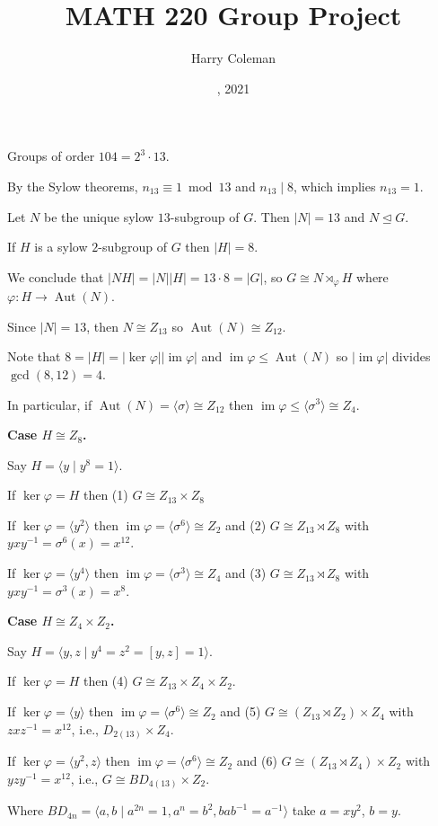 \documentclass[12pt]{article}
\renewcommand{\maketitle}{\thispagestyle{title}}
\theoremstyle{definition}
\renewcommand{\phi}{\varphi}
\newcommand{\<}{\langle}
\renewcommand{\>}{\rangle}
\newcommand{\isom}{\cong}
\newcommand{\teq}{\trianglelefteq}
\DeclareMathOperator{\im}{im}
\DeclareMathOperator{\Aut}{Aut}
\begin{document}
\title{MATH 220 Group Project}
\author{Harry Coleman}
\date{, 2021}
\maketitle

Groups of order $104 = 2^3 \cdot 13$.

By the Sylow theorems, $n_{13} \equiv 1 \bmod 13$ and $n_{13} \mid 8$, which implies $n_{13} = 1$.

Let $N$ be the unique sylow $13$-subgroup of $G$. Then $|N| = 13$ and $N \teq G$.

If $H$ is a sylow $2$-subgroup of $G$ then $|H| = 8$.

We conclude that $|NH| = |N||H| = 13 \cdot 8 = |G|$, so $G \isom N \rtimes_\phi H$ where $\phi : H \to \Aut(N)$.

Since $|N| = 13$, then $N \isom Z_{13}$ so $\Aut(N) \isom Z_{12}$.

Note that $8 = |H| = |\ker\phi||\im\phi|$ and $\im\phi \leq \Aut(N)$ so $|\im\phi|$ divides $\gcd(8, 12) = 4$.

In particular, if $\Aut(N) = \<\sigma\> \isom Z_{12}$ then $\im\phi \leq \<\sigma^3\> \isom Z_4$.

\textbf{Case $H \isom Z_8$.}

Say $H = \<y \mid y^8 = 1\>$.

If $\ker\phi = H$ then (1) $G \isom Z_{13} \times Z_8$

If $\ker\phi = \<y^2\>$ then $\im\phi = \<\sigma^6\> \isom Z_2$ and (2) $G \isom Z_{13} \rtimes Z_8$ with $yxy^{-1} = \sigma^6(x) = x^{12}$.

If $\ker\phi = \<y^4\>$ then $\im\phi = \<\sigma^3\> \isom Z_4$ and (3) $G \isom Z_{13} \rtimes Z_8$ with $yxy^{-1} = \sigma^3(x) = x^8$.

\textbf{Case $H \isom Z_4 \times Z_2$.}

Say $H = \<y, z \mid y^4 = z^2 = [y, z] = 1\>$.

If $\ker\phi = H$ then (4) $G \isom Z_{13} \times Z_4 \times Z_2$.

If $\ker\phi = \<y\>$ then $\im\phi = \<\sigma^6\> \isom Z_2$ and (5) $G \isom (Z_{13} \rtimes Z_2) \times Z_4$ with $zxz^{-1} = x^{12}$, i.e., $D_{2(13)} \times Z_4$.

If $\ker\phi = \<y^2, z\>$ then $\im\phi = \<\sigma^6\> \isom Z_2$ and (6) $G \isom (Z_{13} \rtimes Z_4) \times Z_2$ with $yzy^{-1} = x^{12}$, i.e., $G \isom BD_{4(13)} \times Z_2$.

Where $BD_{4n} = \<a, b \mid a^{2n} = 1, a^n = b^2, bab^{-1} = a^{-1}\>$ take $a = xy^2$, $b = y$.
\end{document}
